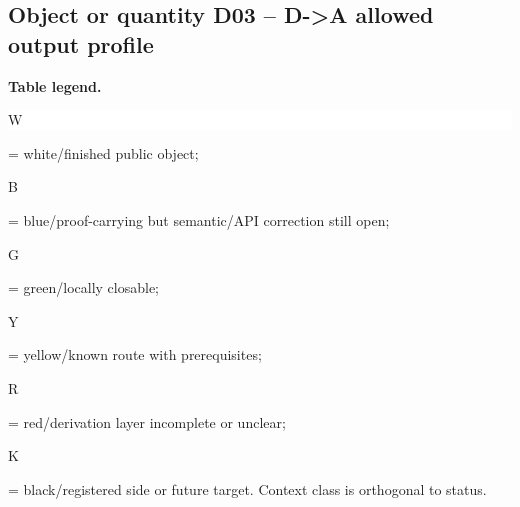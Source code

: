 \subsection*{Object or quantity D03 -- D->A allowed output profile}
\hypertarget{objproof:D03}{}
\par\smallskip\noindent\begin{minipage}{0.99\linewidth}\footnotesize\raggedright\textbf{Table legend.} \colorbox{white}{\strut W} = white/finished public object; \colorbox{cyan!20}{\strut B} = blue/proof-carrying but semantic/API correction still open; \colorbox{green!18}{\strut G} = green/locally closable; \colorbox{yellow!25}{\strut Y} = yellow/known route with prerequisites; \colorbox{red!20}{\strut R} = red/derivation layer incomplete or unclear; \colorbox{black!18}{\strut K} = black/registered side or future target. Context class is orthogonal to status.\end{minipage}\par\vspace{0.25em}
